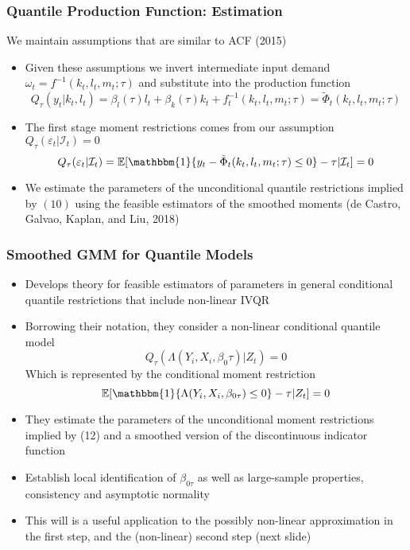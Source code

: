 \documentclass{beamer}
\begin{document}

\begin{frame}
\frametitle{Quantile Production Function: Estimation}
We maintain assumptions that are similar to ACF (2015)
\begin{itemize}
	\item Given these assumptions we invert intermediate input demand $\omega_{t}=f^{-1}(k_{t}, l_{t}, m_{t}; \tau)$ and substitute into the production function
	\begin{equation}
	Q_{\tau}(y_{t}|k_{t}, l_{t})=\beta_{l}(\tau)l_{t}+\beta_{k}(\tau)k_{t}+f_{t}^{-1}(k_{t}, l_{t}, m_{t}; \tau)=\tilde{\Phi}_{t}(k_{t}, l_{t}, m_{t}; \tau)
	\end{equation}
	\item The first stage moment restrictions comes from our assumption $Q_{\tau}(\varepsilon_{t}|\mathcal{I}_{t})=0$
	\begin{equation}
	Q_{\tau}(\varepsilon_{t}|\mathcal{I}_{t})=\mathbb{E}[\mathbbm{1}\{y_{t}-\tilde{\Phi}_{t}(k_{t}, l_{t}, m_{t};\tau)\leq 0 \}-\tau|\mathcal{I}_{t}]=0
	\end{equation}
	\item We estimate the parameters of the unconditional quantile restrictions implied by $(10)$ using the feasible estimators of the smoothed moments (de Castro, Galvao, Kaplan, and Liu, 2018)
\end{itemize}
\end{frame}


\begin{frame}
\frametitle{Smoothed GMM for Quantile Models}
\begin{itemize}
	\item Develops theory for feasible estimators of parameters in general conditional quantile restrictions that include non-linear IVQR
	\item Borrowing their notation, they consider a non-linear conditional quantile model
	\begin{equation}
		Q_{\tau}(\Lambda(Y_{i}, X_{i}, \beta_{0}\tau)|Z_{t})=0
	\end{equation}
	Which is represented by the conditional moment restriction
	\begin{equation}
		\mathbb{E}[\mathbbm{1}\{\Lambda(Y_{i}, X_{i}, \beta_{0\tau})\leq0\}-\tau|Z_{t}]=0
	\end{equation}
	\item They estimate the parameters of the unconditional moment restrictions implied by (12) and a smoothed version of the discontinuous indicator function
	\item Establish local identification of $\beta_{0\tau}$ as well as large-sample properties, consistency and asymptotic normality
	\item This will is a useful application to the possibly non-linear approximation in the first step, and the (non-linear) second step (next slide)
\end{itemize}
\end{frame}
\end{document}
